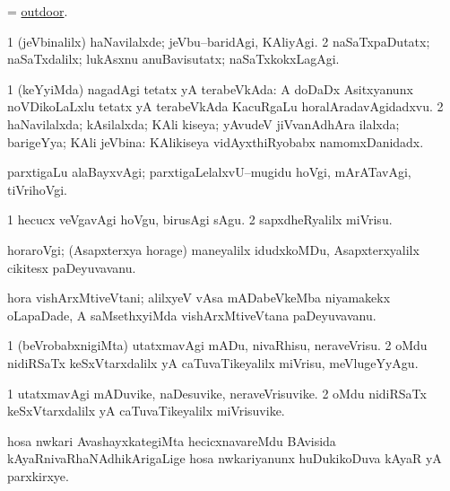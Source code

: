 \bentry
{}
\gl{\gu}
\bmng
= \hyperlink{outdoor}{outdoor}. 
\emng
\eentry

\bentry
{}
\gl{\kirxvi}
\bmng
\bnum
\num{1} (jeVbinalilx) haNavilalxde; jeVbu--baridAgi, KAliyAgi. 
\num{2} naSaTxpaDutatx; naSaTxdalilx; lukAsxnu anuBavisutatx; naSaTxkokxLagAgi. 
\enum
\emng
\eentry

\bentry
{}
\gl{\gu}
\bmng
\bnum
\num{1} (keYyiMda) nagadAgi tetatx yA terabeVkAda:  A doDaDx Asitxyanunx noVDikoLaLxlu tetatx yA terabeVkAda KacuRgaLu horalAradavAgidadxvu. 
\num{2} haNavilalxda; kAsilalxda; KAli kiseya; yAvudeV jiVvanAdhAra ilalxda; barigeYya; KAli jeVbina:  KAlikiseya vidAyxthiRyobabx namomxDanidadx. 
\enum
\emng
\eentry

\bentry
{}
\gl{\kirxvi}
\bmng
parxtigaLu alaBayxvAgi; parxtigaLelalxvU--mugidu hoVgi, mArATavAgi, tiVrihoVgi. 
\emng
\eentry

\bentry
{}
\gl{\sakirx}
\bmng
\bnum
\num{1} hecucx veVgavAgi hoVgu, birusAgi sAgu. 
\num{2} sapxdheRyalilx miVrisu. 
\enum
\emng
\eentry

\bentry
{}
\gl{\nA}
\bmng
horaroVgi; (Asapxterxya horage) maneyalilx idudxkoMDu, Asapxterxyalilx cikitesx paDeyuvavanu. 
\emng
\eentry

\bentry
{}
\gl{\nA}
\bmng
hora vishArxMtiveVtani; alilxyeV vAsa mADabeVkeMba niyamakekx oLapaDade, A saMsethxyiMda vishArxMtiveVtana paDeyuvavanu. 
\emng
\eentry

\bentry
{}
\gl{\sakirx}
\bmng
\bnum
\num{1} (beVrobabxnigiMta) utatxmavAgi mADu, nivaRhisu, neraveVrisu. 
\num{2} oMdu nidiRSaTx keSxVtarxdalilx yA caTuvaTikeyalilx miVrisu, meVlugeYyAgu. 
\enum
\emng
\eentry

\bentry
{}
\gl{\nA}
\bmng
\bnum
\num{1} utatxmavAgi mADuvike, naDesuvike, neraveVrisuvike. 
\num{2} oMdu nidiRSaTx keSxVtarxdalilx yA caTuvaTikeyalilx miVrisuvike. 
\enum
\emng
\eentry

\bentry
{}
\gl{\nA}
\bmng
hosa nwkari AvashayxkategiMta hecicxnavareMdu BAvisida kAyaRnivaRhaNAdhikArigaLige hosa nwkariyanunx huDukikoDuva kAyaR yA parxkirxye. 
\emng
\eentry


